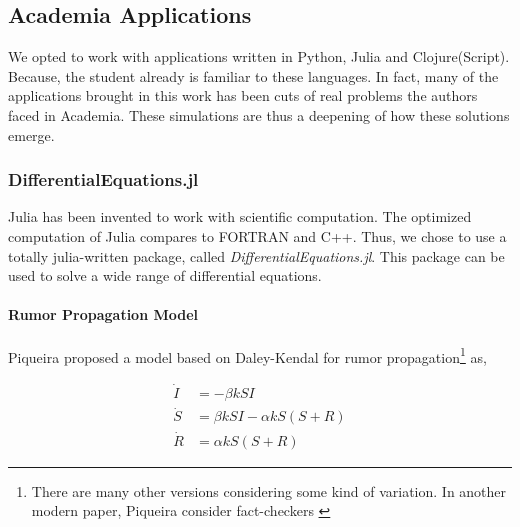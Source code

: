 \documentclass[
12pt,				%
openright,			%
oneside,			%
a4paper,			%
brazil,				%
english,			%
]{abntex2}
\begin{document}
\subsection{Academia Applications}
\label{subsec:res-academia}

We opted to work with applications written in Python, Julia and
Clojure(Script). Because, the student already is familiar to these
languages. In fact, many of the applications brought in this work has
been cuts of real problems the authors faced in Academia. These
simulations are thus a deepening of how these solutions emerge.

\subsubsection{DifferentialEquations.jl}
Julia has been invented to work with scientific computation. The
optimized computation of Julia compares to FORTRAN and C++. Thus, we
chose to use a totally julia-written package, called
\textit{DifferentialEquations.jl}. This package can be used to solve a wide
range of differential equations.

\paragraph{Rumor Propagation Model}

Piqueira \cite{piqueira2010rumor} proposed a model based on Daley-Kendal \cite{daley1964epidemics} for rumor propagation\footnote{There are many other versions considering some kind of variation. In another modern paper, Piqueira consider fact-checkers \cite{piqueira2020daley}} as, 

\begin{equation}
  \begin{align*}
    \dot{I} &= − \beta k SI \\
    \dot{S} &= \beta kSI - \alpha kS (S+R)\\
    \dot{R} &= \alpha k S(S+R)
  \end{align*}
\end{equation}
\end{document}
